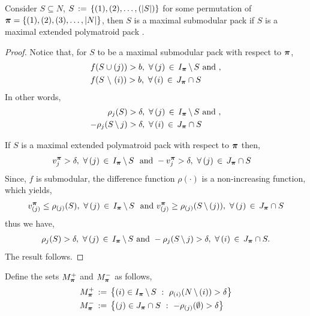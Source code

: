 \documentclass[10pt,twoside]{amsart}
\begin{document}
\begin{prop}
  Consider $S\subseteq N$, $S \,:=\, \{(1), (2), \ldots, (|S|)\}$ for some permutation of $\boldsymbol\pi = \{(1), (2), (3),\ldots, |N|\}$, then $S$ is a maximal submodular pack if $S$ is a maximal extended polymatroid pack {}.
\end{prop}
\begin{proof}
  Notice that, for $S$ to be a maximal submodular pack with respect to $\boldsymbol\pi$,
  \begin{align*}
    & f(S\cup (j)) > b,\,\,\forall\,(j) \,\in\, I_{\boldsymbol\pi}\,\backslash\, S \text{   and },\\
    & f(S\,\,\backslash\,\, (i)) > b,\,\,\forall\,(i) \,\in\, J_{\boldsymbol\pi} \cap S
  \end{align*}
  In other words,
  \begin{align*}
     \rho_j(S) & > \delta,\,\,\forall\,(j) \,\in\, I_{\boldsymbol\pi}\,\backslash\, S \text{   and },\\
     -\rho_j(S\,\backslash\, j) & > \delta,\,\,\forall\,(i) \,\in\, J_{\boldsymbol\pi} \cap S
  \end{align*}

  If $S$ is a  maximal extended polymatroid pack with respect to $\boldsymbol\pi$ then,
  \begin{align*}
    v^{\boldsymbol\pi}_j  > \delta,\,\,\forall\,(j) \,\in\, I_{\boldsymbol\pi}\,\backslash\, S\,\,\text{ and } & -v^{\boldsymbol\pi}_j > \delta,\,\,\forall\,(j) \,\in\, J_{\boldsymbol\pi} \cap S
  \end{align*}
  Since, $f$ is submodular, the difference function $\rho(\cdot)$ is a non-increasing function, which yields,
  $$
        v^{\boldsymbol\pi}_{(j)} \leq  \rho_{(j)}(S),\,\,\forall\,(j) \,\in\, I_{\boldsymbol\pi}\,\backslash\, S\,\,\text{ and }  v^{\boldsymbol\pi}_{(j)} \geq \rho_{(j)}(S\,\backslash\, (j)),\,\,\forall\,(j) \,\in\, J_{\boldsymbol\pi} \cap S
  $$
  thus we have,
  \begin{align*}
    \rho_j(S) > \delta,\,\,\forall\,(j) \,\in\, I_{\boldsymbol\pi}\,\backslash\, S \text{   and } -\rho_j(S\,\backslash\, j) > \delta,\,\,\forall\,(i) \,\in\, J_{\boldsymbol\pi} \cap S.
  \end{align*}
  The result follows.
\end{proof}

Define the sets $M^+_{\boldsymbol\pi}$ and $M^-_{\boldsymbol\pi}$ as follows,
\begin{align}
  M^+_{\boldsymbol\pi} & \,:=\, \left\{ {(i)\in I_{\boldsymbol\pi}\,\backslash\, S} \ : \ {\rho_{(i)}(N\,\backslash\, (i)) > \delta} \right\}\\
  M^-_{\boldsymbol\pi} & \,:=\, \left\{ {(j)\in J_{\boldsymbol\pi}\cap S} \ : \ {-\rho_{(j)}(\emptyset) > \delta} \right\}
\end{align}
\end{document}
